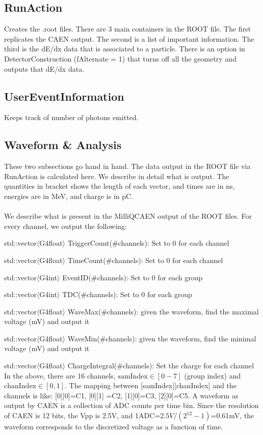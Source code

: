\documentclass[prd,noshowpacs,nofootinbib,amsmath,amssymb,superscriptaddress]{revtex4}
\begin{document}
\subsection{RunAction}
Creates the .root files. There are 3 main containers in the ROOT file. The first replicates the CAEN output. The second is a list of important information. The third is the dE/dx data that is associated to a particle. 
There is an option in DetectorConstruction (fAlternate = 1) that turns off all the geometry and outputs that dE/dx data.
\subsection{UserEventInformation}
Keeps track of number of photons emitted.


\subsection{Waveform \& Analysis}
These two subsections go hand in hand. The data output in the ROOT file via RunAction is calculated here. We describe in detail what is output. The quantities in bracket shows the length of each vector, and times are in ns, energies are in MeV, and charge is in pC.\\ 
\\
We describe what is present in the MilliQCAEN output of the ROOT files. For every channel, we output the following: 
\bi
\item  std::vector$\langle$G4float$\rangle$ TriggerCount(\#channels): Set to 0 for each channel
\item  std::vector$\langle$G4float$\rangle$ TimeCount(\#channels): Set to 0 for each channel
\item  std::vector$\langle$G4int$\rangle$ EventID(\#channels): Set to 0 for each group
\item  std::vector$\langle$G4int$\rangle$ TDC(\#channels): Set to 0 for each group
\item  std::vector$\langle$G4float$\rangle$ WaveMax(\#channels): given the waveform, find the maximal voltage (mV) and output it
\item  std::vector$\langle$G4float$\rangle$ WaveMin(\#channels): given the waveform, find the minimal voltage (mV) and output it
\item  std::vector$\langle$G4float$\rangle$ ChargeIntegral(\#channels): Set the charge for each channel
\ei
In the above, there are 16 channels, $\text{samIndex}\in[0-7]$ (group index) and $\text{chanIndex}\in[0, 1]$. The mapping between [samIndex][chanIndex] and the channels is like: [0][0]=C1, [0][1] =C2, [1][0]=C3, [2][0]=C5. A waveform as output by CAEN is a collection of ADC counts per time bin. Since the resolution of CAEN is 12 bits, the Vpp is 2.5V, and 1ADC=$2.5V/(2^{12}-1)$=0.61mV, the waveform corresponds to the discretized voltage as a function of time. 
\end{document}
